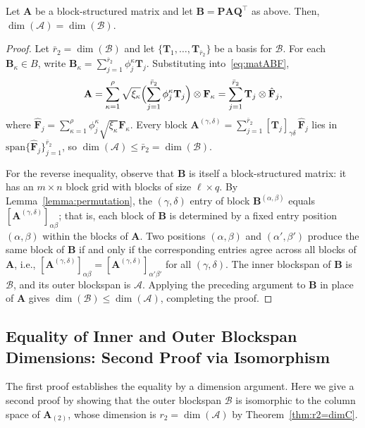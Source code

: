 \documentclass{siamart251216}
\newcommand{\munfold}[2]{\mathbf{#1}_{(#2)}}
\def\bA{\mathbf{A}}
\def\bB{\mathbf{B}}
\def\bF{\mathbf{F}}
\def\bP{\mathbf{P}}
\def\bQ{\mathbf{Q}}
\def\bT{\mathbf{T}}
\begin{document}
\begin{theorem}
\label{thm:dimA=dimB}
Let $\bA$ be a block-structured matrix and let $\bB = \bP\bA\bQ^\top$ as above.  Then,
$\dim(\mathscr{A}) = \dim(\mathscr{B})$.
\end{theorem}

\begin{proof}
Let $\bar r_2 = \dim(\mathscr{B})$ and let $\{\bT_1,\dots,\bT_{\bar r_2}\}$ be a basis for $\mathscr{B}$.  For each $\bB_\kappa\in B$, write $\bB_\kappa = \sum_{j=1}^{\bar r_2}\phi_j^\kappa\bT_j$.  Substituting into~\eqref{eq:matABF},
\begin{equation*}
    \bA = \sum_{\kappa=1}^\rho\sqrt{\xi_\kappa}
          \Bigl(\sum_{j=1}^{\bar r_2}\phi_j^\kappa\bT_j\Bigr)\otimes\bF_\kappa
        = \sum_{j=1}^{\bar r_2}\bT_j\otimes\hat{\bF}_j,
\end{equation*}
where $\hat{\bF}_j = \sum_{\kappa=1}^\rho\phi_j^\kappa\sqrt{\xi_\kappa}\bF_\kappa$.  Every block
$\bA^{(\gamma,\delta)} = \sum_{j=1}^{\bar r_2}[\bT_j]_{\gamma\delta}\,\hat{\bF}_j$ lies in
\linebreak $\mathrm{span}\{\hat{\bF}_j\}_{j=1}^{\bar r_2}$, so $\dim(\mathscr{A})\le\bar r_2 = \dim(\mathscr{B})$.

For the reverse inequality, observe that $\bB$ is itself a block-structured matrix: it has an $m\times n$
block grid with blocks of size $\ell\times q$.  By Lemma~\ref{lemma:permutation}, the $(\gamma,\delta)$
entry of block $\bB^{(\alpha,\beta)}$ equals $[\bA^{(\gamma,\delta)}]_{\alpha\beta}$; that is, each
block of $\bB$ is determined by a fixed entry position $(\alpha,\beta)$ within the blocks of $\bA$.
Two positions $(\alpha,\beta)$ and $(\alpha',\beta')$ produce the same block of $\bB$ if and only if
the corresponding entries agree across all blocks of $\bA$, i.e.,
$[\bA^{(\gamma,\delta)}]_{\alpha\beta} = [\bA^{(\gamma,\delta)}]_{\alpha'\beta'}$ for all
$(\gamma,\delta)$.  The inner blockspan of $\bB$ is $\mathscr{B}$, and its outer blockspan
is $\mathscr{A}$. Applying the preceding argument to $\bB$ in place of
$\bA$ gives $\dim(\mathscr{B})\le\dim(\mathscr{A})$, completing the proof.
\end{proof}

\subsection{Equality of Inner and Outer Blockspan Dimensions: Second Proof via Isomorphism}
\label{sec:second_proof}

The first proof establishes the equality by a dimension argument.  Here we give a second proof by showing that the outer blockspan $\mathscr{B}$ is isomorphic to the column space of
$\munfold{A}{2}$, whose dimension is $r_2 = \dim(\mathscr{A})$ by Theorem~\ref{thm:r2=dimC}.
\end{document}
